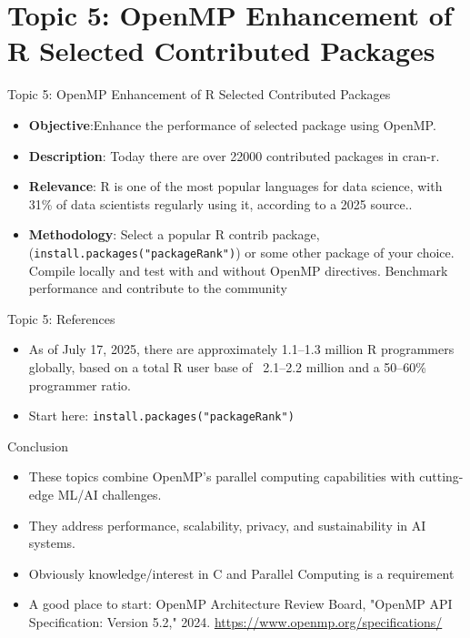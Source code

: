 \documentclass{beamer}
\begin{document}
\section{Topic 5: OpenMP Enhancement of R Selected Contributed Packages}
\begin{frame}{Topic 5: OpenMP Enhancement of R Selected Contributed Packages}
\begin{itemize}
    \item \textbf{Objective}:Enhance the performance of selected package using OpenMP.
    \item \textbf{Description}: Today there are over 22000 contributed packages in cran-r.
    \item \textbf{Relevance}: R is one of the most popular languages for data science, with 31\% 
    of data scientists regularly using it, according to a 2025 source..
    \item \textbf{Methodology}: Select a popular R contrib package, 
    (\texttt{install.packages("packageRank")}) or some other package of your choice. Compile locally and test with and without
    OpenMP directives. Benchmark performance and contribute to the community
\end{itemize}
\end{frame}

\begin{frame}{Topic 5: References}
\begin{itemize}
    \item As of July 17, 2025, there are approximately 1.1–1.3 
million R programmers globally, based on a total R user base of ~2.1–2.2 
million and a 50–60\% programmer ratio.        
    \item Start here: \texttt{install.packages("packageRank")}
\end{itemize}
\end{frame}

\begin{frame}{Conclusion}
\begin{itemize}
    \item These topics combine OpenMP's parallel computing capabilities with cutting-edge ML/AI challenges.
    \item They address performance, scalability, privacy, and sustainability in AI systems.
    \item Obviously knowledge/interest in C and Parallel Computing
    is a requirement
    \item A good place to start: OpenMP Architecture Review Board, "OpenMP API Specification: Version 5.2," 2024. \url{https://www.openmp.org/specifications/}
\end{itemize}
\end{frame}
\end{document}
